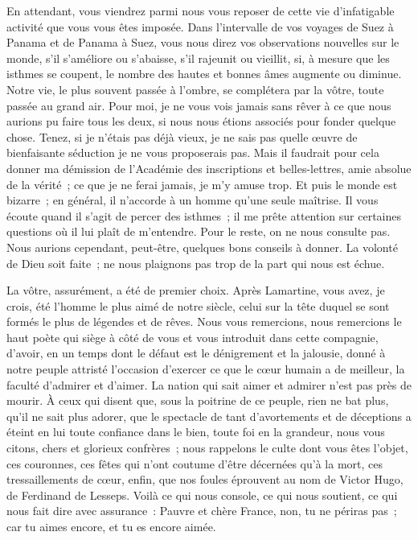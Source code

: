 \documentclass[french,twoside]{book} %
\newcommand\orgName[1]{#1}
\newcommand\persName[1]{#1}
\newcommand\placeName[1]{#1}
\begin{document}
En attendant, vous viendrez parmi nous vous reposer de cette vie d’infatigable activité que vous vous êtes imposée. Dans l’intervalle de vos voyages de {\placeName Suez} à {\placeName Panama} et de {\placeName Panama} à {\placeName Suez}, vous nous direz vos observations nouvelles sur le monde, s’il s’améliore ou s’abaisse, s’il rajeunit ou vieillit, si, à mesure que les isthmes se coupent, le nombre des hautes et bonnes âmes augmente ou diminue. Notre vie, le plus souvent passée à l’ombre, se complétera par la vôtre, toute passée au grand air. Pour moi, je ne vous vois jamais sans rêver à ce que nous aurions pu faire tous les deux, si nous nous étions associés pour fonder quelque chose. Tenez, si je n’étais pas déjà vieux, je ne sais pas quelle œuvre de bienfaisante séduction je ne vous proposerais pas. Mais il faudrait pour cela donner ma démission de l’{\orgName Académie des inscriptions et belles-lettres}, amie absolue de la vérité ; ce que je ne ferai jamais, je m’y amuse trop. Et puis le monde est bizarre ; en général, il n’accorde à un homme qu’une seule maîtrise. Il vous écoute quand il s’agit de percer des isthmes ; il me prête attention sur certaines questions où il lui plaît de m’entendre. Pour le reste, on ne nous consulte pas. Nous aurions cependant, peut-être, quelques bons conseils à donner. La volonté de {\persName Dieu} soit faite ; ne nous plaignons pas trop de la part qui nous est échue.\par
La vôtre, assurément, a été de premier choix. Après Lamartine, vous avez, je crois, été l’homme le plus aimé de notre siècle, celui sur la tête duquel se sont formés le plus de légendes et de rêves. Nous vous remercions, nous remercions le haut poète qui siège à côté de vous et vous introduit dans cette compagnie, d’avoir, en un temps dont le défaut est le dénigrement et la jalousie, donné à notre peuple attristé l’occasion d’exercer ce que le cœur humain a de meilleur, la faculté d’admirer et d’aimer. La nation qui sait aimer et admirer n’est pas près de mourir. À ceux qui disent que, sous la poitrine de ce peuple, rien ne bat plus, qu’il ne sait plus adorer, que le spectacle de tant d’avortements et de déceptions a éteint en lui toute confiance dans le bien, toute foi en la grandeur, nous vous citons, chers et glorieux confrères ; nous rappelons le culte dont vous êtes l’objet, ces couronnes, ces fêtes qui n’ont coutume d’être décernées qu’à la mort, ces tressaillements de cœur, enfin, que nos foules éprouvent au nom de Victor Hugo, de Ferdinand de Lesseps. Voilà ce qui nous console, ce qui nous soutient, ce qui nous fait dire avec assurance : Pauvre et chère {\orgName France}, non, tu ne périras pas ; car tu aimes encore, et tu es encore aimée.
\end{document}
